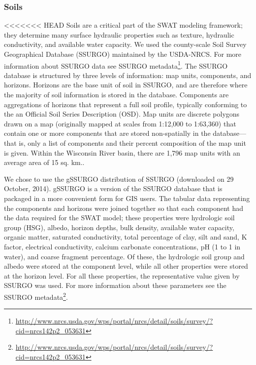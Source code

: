 \subsubsection{Soils}
<<<<<<< HEAD
Soils are a critical part of the SWAT modeling framework; they determine many surface hydraulic properties such as texture, hydraulic conductivity, and available water capacity. We used the county-scale Soil Survey Geographical Database (SSURGO) maintained by the USDA-NRCS. For more information about SSURGO data see SSURGO metadata\footnote{\url{http://www.nrcs.usda.gov/wps/portal/nrcs/detail/soils/survey/?cid=nrcs142p2_053631}}. The SSURGO database is structured by three levels of information: map units, components, and horizons. Horizons are the base unit of soil in SSURGO, and are therefore where the majority of soil information is stored in the database. Components are aggregations of horizons that represent a full soil profile, typically conforming to the an Official Soil Series Description (OSD). Map units are discrete polygons drawn on a map (originally mapped at scales from 1:12,000 to 1:63,360) that contain one or more components that are stored non-spatially in the database---that is, only a list of components and their percent composition of the map unit is given. Within the Wisconsin River basin, there are 1,796 map units with an average area of 15 sq. km.. 

We chose to use the gSSURGO distribution of SSURGO (downloaded on 29 October, 2014). gSSURGO is a version of the SSURGO database that is packaged in a more convenient form for GIS users. The tabular data representing the components and horizons were joined together so that each component had the data required for the SWAT model; these properties were hydrologic soil group (HSG), albedo, horizon depths, bulk density, available water capacity, organic matter, saturated conductivity, total percentage of clay, silt and sand, K factor, electrical conductivity, calcium carbonate concentrations, pH (1 to 1 in water), and coarse fragment percentage. Of these, the hydrologic soil group and albedo were stored at the component level, while all other properties were stored at the horizon level. For all these properties, the representative value given by SSURGO was used. For more information about these parameters see the SSURGO metadata\footnote{\url{http://www.nrcs.usda.gov/wps/portal/nrcs/detail/soils/survey/?cid=nrcs142p2_053631}}.

